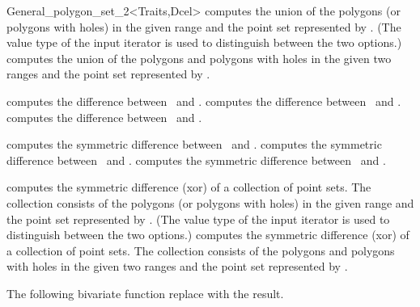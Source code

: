 \begin{ccRefClass}{General_polygon_set_2<Traits,Dcel>}
  {computes the union of the polygons (or polygons with holes) in the 
   given range and the point set represented by \ccVar. (The value type 
   of the input iterator is used to distinguish between the two options.)}
\ccGlue
{}
  {computes the union of the polygons and polygons with holes in the 
   given two ranges and the point set represented by \ccVar.}

  {computes the difference between \ccVar\ and .}
\ccGlue
{}
  {computes the difference between \ccVar\ and .}
\ccGlue
{}
  {computes the difference between \ccVar\ and .}

  {computes the symmetric difference between \ccVar\ and .}
\ccGlue
{}
  {computes the symmetric difference between \ccVar\ and .}
\ccGlue
{}
  {computes the symmetric difference between \ccVar\ and .}

  {computes the symmetric difference (xor) of a collection of point sets.
   The collection consists of the polygons (or polygons with holes) in the 
   given range and the point set represented by \ccVar. (The value type of 
   the input iterator is used to distinguish between the two options.)}
\ccGlue
{}
  {computes the symmetric difference (xor) of a collection of point sets.
   The collection consists of the polygons and polygons with holes in the
   given two ranges and the point set represented by \ccVar.}

The following bivariate function replace  with the result.


\end{ccRefClass}
